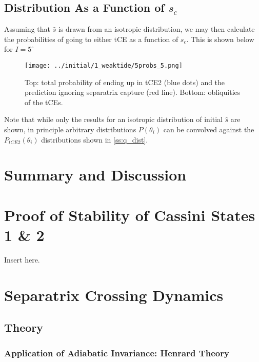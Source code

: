 \documentclass[
        fleqn,
        usenatbib,
        referee,
    ]{mnras}
\newcommand*{\p}[1]{\left(#1\right)}
\begin{document}
\subsection{Distribution As a Function of $s_c$}\label{ss:s_c_dist}

Assuming that $\hat{s}$ is drawn from an isotropic distribution, we may then
calculate the probabilities of going to either tCE as a function of $s_c$. This
is shown below for $I = 5^\circ$
\begin{figure}
    \centering
    \texttt{[image: ../initial/1\_weaktide/5probs\_5.png]}
    \caption{Top: total probability of ending up in tCE2 (blue dots) and the
    prediction ignoring separatrix capture (red line). Bottom:
    obliquities of the tCEs.}\label{fig:probs}
\end{figure}

Note that while only the results for an isotropic distribution of initial
$\hat{s}$ are shown, in principle arbitrary distributions $P\p{\theta_i}$ can be
convolved against the $P_{tCE2}\p{\theta_i}$ distributions shown in
\autoref{ss:q_dist}.

\section{Summary and Discussion}\label{s:summary}




\appendix
\section{Proof of Stability of Cassini States 1 \& 2}\label{app:cs_stab}

Insert here.

\section{Separatrix Crossing Dynamics}

\subsection{Theory}\label{app:sep_crossing_dynamics}

\subsubsection{Application of Adiabatic Invariance: Henrard Theory}
\end{document}

